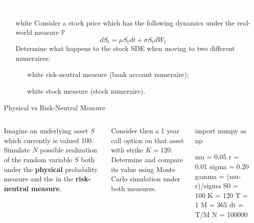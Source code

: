 \documentclass{beamer}
\begin{document}
\begin{homework}
	\begin{frame}{\textcolor{white}{Homework}}
		\begin{itemize}
			\item[white] Consider a stock price which has the following dynamics under the real-world measure $\mathbb{P}$
			\begin{equation*}
				dS_t = \mu S_t dt + \sigma S_t dW_t
			\end{equation*}
			Determine what happens to the stock SDE when moving to two different numeraires:
			\begin{itemize}
				\item[white] risk-neutral measure (bank account numeraire);
				\item[white] stock measure (stock numeraire).
			\end{itemize}
		\end{itemize}
	\end{frame}
\end{homework}

\begin{frame}[fragile]{Physical vs Risk-Neutral Measure}
	\begin{columns}
		Imagine an underlying asset $S$ which currently is valued 100. Simulate $N$ possible realization of the random variable $S$ both under the \textbf{physical} probability measure and the in the \textbf{risk-neutral measure}.
		
		Consider then a 1 year call option on that asset with strike $K=120$. Determine and compare its value using Monte Carlo simulation under both measures.	
		\begin{ipython}	
import numpy as np

mu = 0.05
r = 0.01
sigma = 0.20
gamma = (mu-r)/sigma
S0 = 100
K = 120
T = 1
M = 365
dt = T/M
N = 100000
		\end{ipython}
	\end{columns}
\end{frame}
\end{document}
